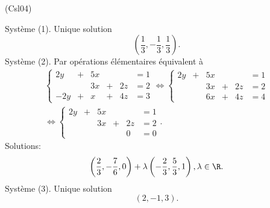 \begin{tiny}(Csl04)\end{tiny}
Système (1). Unique solution
\[
  \left( \frac{1}{3}, -\frac{1}{3}, \frac{1}{3}\right). 
\]
Système (2). Par opérations élémentaires équivalent à
\begin{multline*}
  \left\lbrace 
  \begin{alignedat}{4}
    2y &+& 5x & &    &= 1\\
       & & 3x &+& 2z &= 2\\
   -2y &+& x  &+& 4z &= 3    
  \end{alignedat}
  \right.
\Leftrightarrow
  \left\lbrace 
  \begin{alignedat}{4}
    2y &+& 5x & &    &= 1\\
       & & 3x &+& 2z &= 2\\
       & & 6x &+& 4z &= 4    
  \end{alignedat}
  \right. \\
\Leftrightarrow
  \left\lbrace 
  \begin{alignedat}{4}
    2y &+& 5x & &    &= 1\\
       & & 3x &+& 2z &= 2\\
       & &    & & 0  &= 0    
  \end{alignedat}
  \right. .
\end{multline*}
Solutions:
\[
  \left( \frac{2}{3}, -\frac{7}{6}, 0\right) + \lambda\left( -\frac{2}{3}, \frac{5}{3}, 1\right), \lambda \in \R. 
\]
Système (3). Unique solution
\[
  (2,-1,3).
\]

